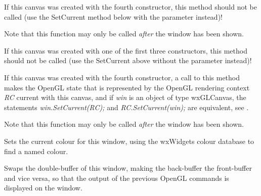 If this canvas was created with the fourth constructor, this method should not be called
(use the SetCurrent method below with the parameter instead)!

Note that this function may only be called \emph{after} the window has been shown.


\label{wxglcanvassetcurrent_rc}


If this canvas was created with one of the first three constructors,
this method should not be called (use the SetCurrent above without the parameter instead)!

If this canvas was created with the fourth constructor, a call to this method
makes the OpenGL state that is represented by the OpenGL rendering context { \it RC } current with this canvas,
and if { \it win } is an object of type wxGLCanvas, the statements { \it win.SetCurrent(RC); } and { \it RC.SetCurrent(win); } are equivalent,
see .

Note that this function may only be called \emph{after} the window has been shown.


\label{wxglcanvassetcolour}


Sets the current colour for this window, using the wxWidgets colour database to find a named colour.


\label{wxglcanvasswapbuffers}


Swaps the double-buffer of this window, making the back-buffer the front-buffer and vice versa,
so that the output of the previous OpenGL commands is displayed on the window.

